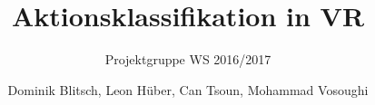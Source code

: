 \documentclass[german,11pt]{scrartcl}
\begin{document}
\sloppy

\setcounter{tocdepth}{2}

\title{Aktionsklassifikation in VR}
\subtitle{Projektgruppe WS 2016/2017}
\author{Dominik Blitsch, Leon Hüber, Can Tsoun, Mohammad Vosoughi}

\maketitle






\clearpage
\end{document}
